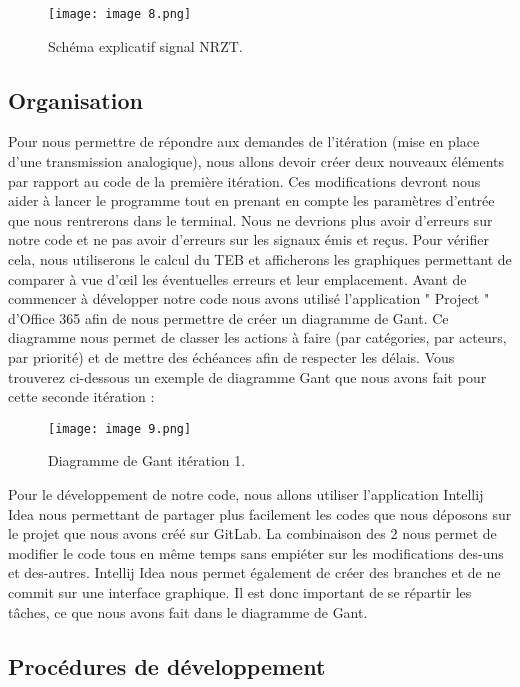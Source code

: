 \begin{figure}[h]
    \centering
    \texttt{[image: image 8.png]}
    \caption{\label{fig:image8}Schéma explicatif signal NRZT.}
\end{figure}

\subsection{Organisation}

Pour nous permettre de répondre aux demandes de l'itération (mise en place d'une transmission analogique), nous allons devoir créer deux nouveaux éléments par rapport au code de la première itération. Ces modifications devront nous aider à lancer le programme tout en prenant en compte les paramètres d'entrée que nous rentrerons dans le terminal.
Nous ne devrions plus avoir d'erreurs sur notre code et ne pas avoir d'erreurs sur les signaux émis et reçus. Pour vérifier cela, nous utiliserons le calcul du TEB et afficherons les graphiques permettant de comparer à vue d'œil les éventuelles erreurs et leur emplacement.
Avant de commencer à développer notre code nous avons utilisé l'application " Project " d'Office 365 afin de nous permettre de créer un diagramme de Gant. Ce diagramme nous permet de classer les actions à faire (par catégories, par acteurs, par priorité) et de mettre des échéances afin de respecter les délais. Vous trouverez ci-dessous un exemple de diagramme Gant que nous avons fait pour cette seconde itération :

\begin{figure}[h]
    \centering
    \texttt{[image: image 9.png]}
    \caption{\label{fig:image9}Diagramme de Gant itération 1.}
\end{figure}

Pour le développement de notre code, nous allons utiliser l'application Intellij Idea nous permettant de partager plus facilement les codes que nous déposons sur le projet que nous avons créé sur GitLab. La combinaison des 2 nous permet de modifier le code tous en même temps sans empiéter sur les modifications des-uns et des-autres. Intellij Idea nous permet également de créer des branches et de ne commit sur une interface graphique. Il est donc important de se répartir les tâches, ce que nous avons fait dans le diagramme de Gant.

\subsection{Procédures de développement}
